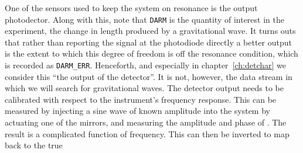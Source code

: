 One of the sensors used to keep the system on resonance is the output
photodector.  Along with this, note that \texttt{DARM} is the quantity
of interest in the experiment, the change in length produced by a
gravitational wave.    It turns outs that rather than reporting the
signal at the photodiode directly a better output is the extent to
which this degree of freedom is off the resonance condition, which is
recorded as \texttt{DARM\_ERR}.  Henceforth, and especially in
chapter~\ref{ch:detchar} we consider this ``the output of the
detector''.  It is not, however, the data stream in which we will
search for gravitational waves.  The detector output needs to be
calibrated with respect to the instrument's frequency response.  This
can be measured by injecting a sine wave of known amplitude into the
system by actuating one of the mirrors, and measuring the amplitude
and phase of \darmerr.  The result is a complicated function of
frequency.  This can then be inverted to map \darmerr back to the true

